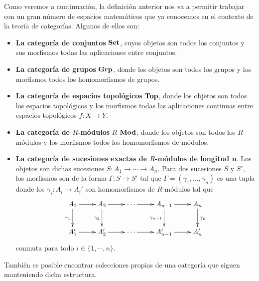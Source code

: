 \begin{ejemplo}
	Como veremos a continuación, la definición anterior nos va a permitir trabajar
	con un gran número de espacios matemáticos que ya conocemos en el contexto de
	la teoría de categorías. Algunos de ellos son:
	\begin{itemize}
		\item \textbf{La categoría de conjuntos} \(\mathbf{Set}\), cuyos objetos son todos
		los conjuntos y sus morfismos todas las aplicaciones entre conjuntos.
		
		\item \textbf{La categoría de grupos} \(\mathbf{Grp}\), donde los objetos son todos
		los grupos y los morfismos todos los homomorfismos de grupos.
		
		\item \textbf{La categoría de espacios topológicos} \(\mathbf{Top}\), donde los objetos
		son todos los espacios topológicos y los morfismos todas las aplicaciones continuas
		entre espacios topológicos \(f: X \rightarrow Y\).
		
		\item \textbf{La categoría de \(R\)-módulos} \(R\)-\(\mathbf{Mod}\), donde los objetos
		son todos los \(R\)-módulos y los morfismos todos los homomorfismos de módulos.
		
		\item \textbf{La categoría de sucesiones exactas de \(R\)-módulos de longitud
			n}. Los objetos son dichas sucesiones \(S: A_{1}\rightarrow \cdots \rightarrow
		A_{n}\). Para dos sucesiones \(S\) y \(S'\), los morfismos son de la forma \(\Gamma
		: S \rightarrow S'\) tal que \(\Gamma = (\gamma_{1}, \ldots, \gamma_{n})\) es
		una tupla donde los \(\gamma_{i}: A_{i}\rightarrow A_{i}'\) son homomorfismos
		de \(R\)-módulos tal que
		\begin{equation}
			\label{exactseqcat}\xymatrix{ A_1 \ar[r] \ar[d]_{\gamma_1} & A_2 \ar[r] \ar[d]_{\gamma_2} & \cdots \ar[r] & A_{n-1} \ar[r] \ar[d]_{\gamma_{n-1}} & A_n \ar[d]^{\gamma_n} \\ A'_1 \ar[r] & A'_2 \ar[r] & \cdots \ar[r] & A'_{n-1} \ar[r] & A'_n }
		\end{equation}
		conmuta para todo \(i \in \{ 1, \cdots, n \}\).
	\end{itemize}
\end{ejemplo}

También es posible encontrar colecciones propias de una categoría que siguen manteniendo dicha estructura.

